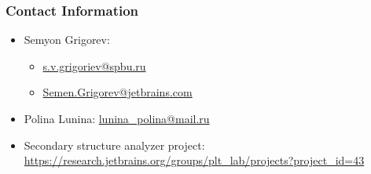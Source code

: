 \documentclass[xcolor=table]{beamer}
\begin{document}
\begin{frame}
\frametitle{Contact Information}
\begin{itemize}
  \item Semyon Grigorev:
    \begin{itemize}
      \item \href{mailto:s.v.grigoriev@spbu.ru}{s.v.grigoriev@spbu.ru}
      \item \href{mailto:Semen.Grigorev@jetbrains.com}{Semen.Grigorev@jetbrains.com}
    \end{itemize}
  \item Polina Lunina: \href{mailto:lunina\_polina@mail.ru}{lunina\_polina@mail.ru}
  \item Secondary structure analyzer project: \href{https://research.jetbrains.org/groups/plt\_lab/projects?project\_id=43}{https://research.jetbrains.org/groups/plt\_lab/projects?project\_id=43}
\end{itemize}
\vspace{0.3cm}
\end{frame}
\end{document}
